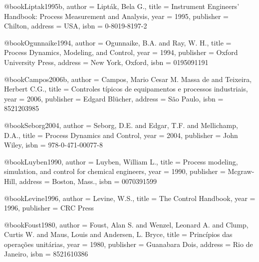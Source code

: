 @book{Liptak1995b,
  author = {Lipták, Bela G.},
  title = {Instrument Engineers' Handbook: Process Measurement and Analysis},
  year = {1995},
  publisher = {Chilton},
  address = {USA},
  isbn = {0-8019-8197-2}
}

%

@book{Ogunnaike1994,
  author = {Ogunnaike, B.A. and Ray, W. H.},
  title = {Process Dynamics, Modeling, and Control},
  year = {1994},
  publisher = {Oxford University Press},
  address = {New York, Oxford},
  isbn = {0195091191}
}

@book{Campos2006b,
  author = {Campos, Mario Cesar M. Massa de and Teixeira, Herbert C.G.},
  title = {Controles típicos de equipamentos e processos industriais},
  year = {2006},
  publisher = {Edgard Blücher},
  address = {São Paulo},
  isbn = {8521203985}
}

@book{Seborg2004,
  author = {Seborg, D.E. and Edgar, T.F. and Mellichamp, D.A.},
  title = {Process Dynamics and Control},
  year = {2004},
  publisher = {John Wiley},
  isbn = {978-0-471-00077-8}
}

@book{Luyben1990,
  author = {Luyben, William L.},
  title = {Process modeling, simulation, and control for chemical engineers},
  year = {1990},
  publisher = {Mcgraw-Hill},
  address = {Boston, Mass.},
  isbn = {0070391599}
}

@book{Levine1996,
  author = {Levine, W.S.},
  title = {The Control Handbook},
  year = {1996},
  publisher = {CRC Press}
}

@book{Foust1980,
  author = {Foust, Alan S. and Wenzel, Leonard A. and Clump, Curtis W. and Maus, Louis and Andersen, L. Bryce},
  title = {Princípios das operações unitárias},
  year = {1980},
  publisher = {Guanabara Dois},
  address = {Rio de Janeiro},
  isbn = {8521610386}
}

